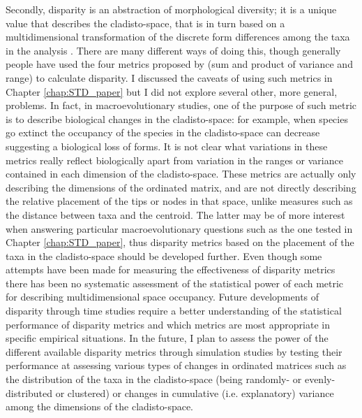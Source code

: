 Secondly, disparity is an abstraction of morphological diversity; it is a unique value that describes the cladisto-space, that is in turn based on a multidimensional transformation of the discrete form differences among the taxa in the analysis \citep{Wills1994,foote1997evolution}.
There are many different ways of doing this, though generally people have used the four metrics proposed by \cite{Wills1994} (sum and product of variance and range) to calculate disparity.
I discussed the caveats of using such metrics in Chapter \ref{chap:STD_paper} but I did not explore several other, more general, problems.
In fact, in macroevolutionary studies, one of the purpose of such metric is to describe biological changes in the cladisto-space: for example, when species go extinct the occupancy of the species in the cladisto-space can decrease suggesting a biological loss of forms.
It is not clear what variations in these metrics really reflect biologically apart from variation in the ranges or variance contained in each dimension of the cladisto-space.
These metrics are actually only describing the dimensions of the ordinated matrix, and are not directly describing the relative placement of the tips or nodes in that space, unlike measures such as the distance between taxa and the centroid. 
The latter may be of more interest when answering particular macroevolutionary questions such as the one tested in Chapter \ref{chap:STD_paper}, thus disparity metrics based on the placement of the taxa in the cladisto-space should be developed further.
Even though some attempts have been made for measuring the effectiveness of disparity metrics \citep{Ciampaglio2001} there has been no systematic assessment of the statistical power of each metric for describing multidimensional space occupancy.
Future developments of disparity through time studies require a better understanding of the statistical performance of disparity metrics and which metrics are most appropriate in specific empirical situations.
In the future, I plan to assess the power of the different available disparity metrics \citep[e.g.][]{Wills1994,Ciampaglio2004,Hughes20082013,huang2015origins} through simulation studies by testing their performance at assessing various types of changes in ordinated matrices such as the distribution of the taxa in the cladisto-space (being randomly- or evenly-distributed or clustered) or changes in cumulative (i.e. explanatory) variance among the dimensions of the cladisto-space.

